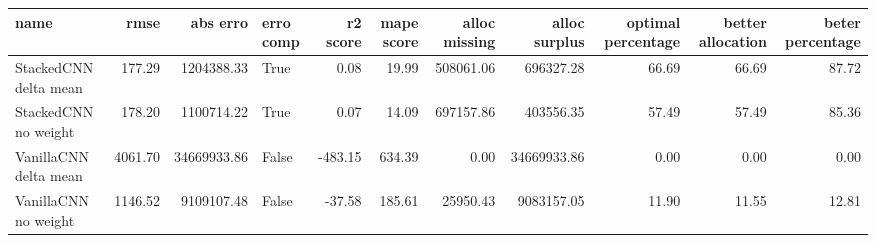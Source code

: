 \begin{tabular}{lrrlrrrrrrr}
\toprule
name & rmse & abs erro & erro comp & r2 score & mape score & alloc missing & alloc surplus & optimal percentage & better allocation & beter percentage \\
\midrule
StackedCNN delta mean & 177.29 & 1204388.33 & True & 0.08 & 19.99 & 508061.06 & 696327.28 & 66.69 & 66.69 & 87.72 \\
StackedCNN no weight & 178.20 & 1100714.22 & True & 0.07 & 14.09 & 697157.86 & 403556.35 & 57.49 & 57.49 & 85.36 \\
VanillaCNN delta mean & 4061.70 & 34669933.86 & False & -483.15 & 634.39 & 0.00 & 34669933.86 & 0.00 & 0.00 & 0.00 \\
VanillaCNN no weight & 1146.52 & 9109107.48 & False & -37.58 & 185.61 & 25950.43 & 9083157.05 & 11.90 & 11.55 & 12.81 \\
\bottomrule
\end{tabular}
